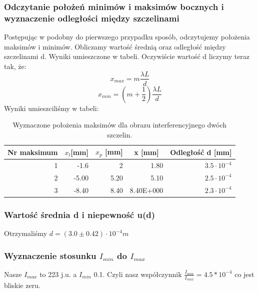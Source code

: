 \documentclass{article}
\begin{document}
\subsubsection{Odczytanie położeń minimów i maksimów bocznych i wyznaczenie odległości między szczelinami}
Postępując w podobny do pierwszego przypadku sposób, odczytujemy położenia maksimów i minimów. Obliczamy wartość średnią oraz  odległość między szczelinami d. Wyniki umieszczone w tabeli. Oczywiście wartość d liczymy teraz tak, że:
\begin{equation}
x_{max} = m \frac{\lambda L}{d}
\end{equation}
\begin{equation}
x_{min} = (m+\frac{1}{2}) \frac{\lambda L}{d}
\end{equation}
Wyniki umieszciliśmy w tabeli:
\begin{table}[htbp]
\centering
\begin{tabular}{|r|r|r|r|r|}
\hline
\multicolumn{1}{|c|}{\textbf{Nr maksimum}} & \multicolumn{1}{c|}{\textbf{$x_{l}$[mm]}} & \multicolumn{1}{c|}{\textbf{$x_{p}$ [mm]}} & \multicolumn{1}{c|}{\textbf{x [mm]}} & \multicolumn{1}{c|}{\textbf{Odległość d [mm]}} \\ \hline
1 & -1.6 & 2 & 1.80 & $3.5 \cdot 10^{-4}$ \\ \hline
2 & -5.00 & 5.20 & 5.10 & $2.5 \cdot 10^{-4}$ \\ \hline
3 & -8.40 & 8.40 & 8.40E+000 & $2.3 \cdot 10^{-4}$ \\ \hline
\end{tabular}
\caption{Wyznaczone położenia maksimów dla obrazu interferencyjnego dwóch szczelin.}
\label{}
\end{table}

\subsubsection{Wartość średnia d i niepewność u(d)}
Otrzymaliśmy $d = (3.0 \pm 0.42) \cdot 10^{-4} m$ 
\subsubsection{Wyznaczenie stosunku $I_{min}$ do $I_{max}$}
Nasze $I_{max}$ to 223 j.u. a $I_{min}$ 0.1. Czyli nasz współczynnik $\frac{I_{min}}{I_{max}} = 4.5*10^{-4}$ co jest bliskie zeru.


\end{document}

